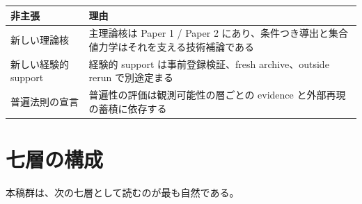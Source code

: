 \documentclass[12pt,a4paper]{article}
\begin{document}
{\def\LTcaptype{table} %
\begin{longtable}[]{@{}
  >{\raggedright\arraybackslash}p{}
  >{\raggedright\arraybackslash}p{}@{}}
\toprule\noalign{}
\begin{minipage}[b]{\linewidth}\raggedright
非主張
\end{minipage} & \begin{minipage}[b]{\linewidth}\raggedright
理由
\end{minipage} \\
\midrule\noalign{}
\endhead
\bottomrule\noalign{}
\endlastfoot
新しい理論核 & 主理論核は Paper 1 / Paper 2 にあり、条件つき導出と集合値力学はそれを支える技術補論である \\
新しい経験的 support & 経験的 support は事前登録検証、fresh archive、outside rerun で別途定まる \\
普遍法則の宣言 & 普遍性の評価は観測可能性の層ごとの evidence と外部再現の蓄積に依存する \\
\end{longtable}
}

\section{七層の構成}\label{ux4e03ux5c64ux306eux69cbux6210}

本稿群は、次の七層として読むのが最も自然である。
\end{document}
